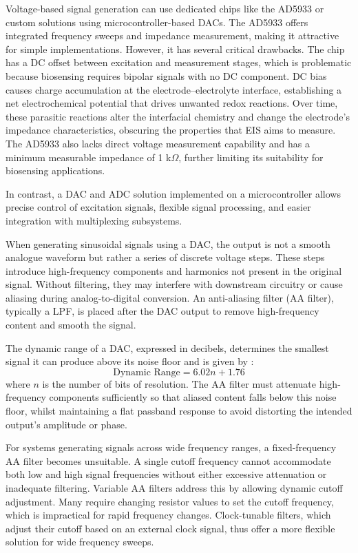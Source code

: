 Voltage-based signal generation can use dedicated chips like the AD5933 or custom solutions using microcontroller-based \acp{DAC}. The AD5933 offers integrated frequency sweeps and impedance measurement, making it attractive for simple implementations. However, it has several critical drawbacks. The chip has a DC offset between excitation and measurement stages, which is problematic because biosensing requires bipolar signals with no DC component. DC bias causes charge accumulation at the electrode–electrolyte interface, establishing a net electrochemical potential that drives unwanted redox reactions. Over time, these parasitic reactions alter the interfacial chemistry and change the electrode's impedance characteristics, obscuring the properties that \ac{EIS} aims to measure. The AD5933 also lacks direct voltage measurement capability and has a minimum measurable impedance of 1 k$\Omega$, further limiting its suitability for biosensing applications.

In contrast, a \ac{DAC} and \ac{ADC} solution implemented on a microcontroller allows precise control of excitation signals, flexible signal processing, and easier integration with multiplexing subsystems. 

When generating sinusoidal signals using a \ac{DAC}, the output is not a smooth analogue waveform but rather a series of discrete voltage steps. These steps introduce high-frequency components and harmonics not present in the original signal. Without filtering, they may interfere with downstream circuitry or cause aliasing during analog-to-digital conversion. An anti-aliasing filter (AA filter), typically a \ac{LPF}, is placed after the \ac{DAC} output to remove high-frequency content and smooth the signal.

The dynamic range of a \ac{DAC}, expressed in decibels, determines the smallest signal it can produce above its noise floor and is given by \cite{gaddyDYNAMICPERFORMANCETESTING}:
\begin{equation}
    \text{Dynamic Range} = 6.02n + 1.76 
    \label{eq:dac_range_lit}
\end{equation}
where $n$ is the number of bits of resolution. The AA filter must attenuate high-frequency components sufficiently so that aliased content falls below this noise floor, whilst maintaining a flat passband response to avoid distorting the intended output's amplitude or phase.

For systems generating signals across wide frequency ranges, a fixed-frequency AA filter becomes unsuitable. A single cutoff frequency cannot accommodate both low and high signal frequencies without either excessive attenuation or inadequate filtering. Variable AA filters address this by allowing dynamic cutoff adjustment. Many require changing resistor values to set the cutoff frequency, which is impractical for rapid frequency changes. Clock-tunable filters, which adjust their cutoff based on an external clock signal, thus offer a more flexible solution for wide frequency sweeps.

